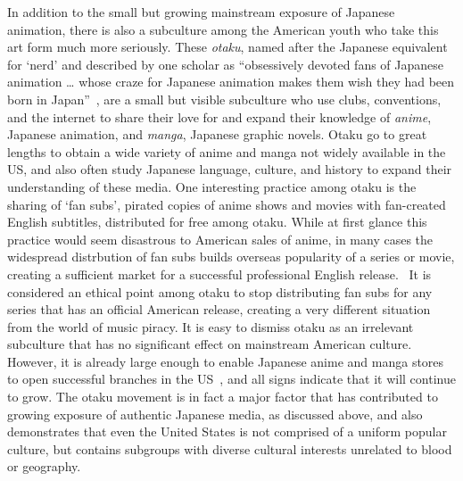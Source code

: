 \documentclass[12pt]{article}
\begin{document}
In addition to the small but growing mainstream exposure of Japanese animation, there is also a subculture among the American youth who take this art form much more seriously.  These \emph{otaku}, named after the Japanese equivalent for `nerd' and described by one scholar as ``obsessively devoted fans of Japanese animation \ldots{} whose craze for Japanese animation makes them wish they had been born in Japan''~\cRecentering{\citep[pg.\ 31]}, 
are a small but visible subculture who use clubs, conventions, and the internet to share their love for and expand their knowledge of \emph{anime}, Japanese animation, and \emph{manga}, Japanese graphic novels.  Otaku go to great lengths to obtain a wide variety of anime and manga not widely available in the US, and also often study Japanese language, culture, and history to expand their understanding of these media.
One interesting practice among otaku is the sharing of `fan subs', pirated copies of anime shows and movies with fan-created English subtitles, distributed for free among otaku.  While at first glance this practice would seem disastrous to American sales of anime, in many cases the widespread distrbution of fan subs builds overseas popularity of a series or movie, creating a sufficient market for a successful professional English release.~\cPiracy{\citep[pg.\ 355]}
It is considered an ethical point among otaku to stop distributing fan subs for any series that has an official American release, creating a very different situation from the world of music piracy.  It is easy to dismiss otaku as an irrelevant subculture that has no significant effect on mainstream American culture. However, it is already large enough to enable Japanese anime and manga stores to open successful branches in the US~\cCool{\citep[pg.\ 46]}, and all signs indicate that it will continue to grow. The otaku movement is in fact a major factor that has contributed to growing exposure of authentic Japanese media, as discussed above, and also demonstrates that even the United States is not comprised of a uniform popular culture, but contains subgroups with diverse cultural interests unrelated to blood or geography.
\end{document}
